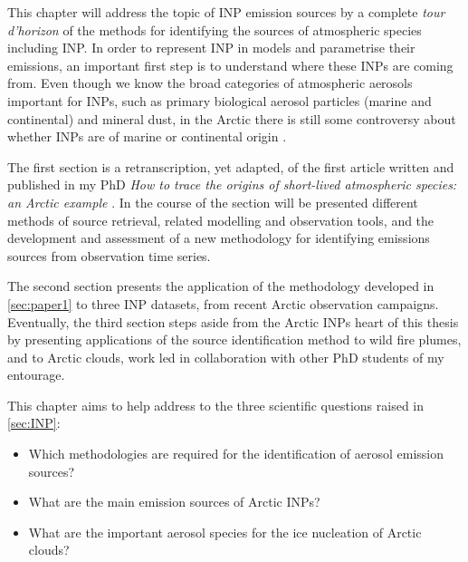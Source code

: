 This chapter will address the topic of INP emission sources by a complete \textit{tour d'horizon} of the methods for identifying the sources of atmospheric species including INP.
In order to represent INP in models and parametrise their emissions, an important first step is to understand where these INPs are coming from. Even though we know the broad categories of atmospheric aerosols important for INPs, such as primary biological aerosol particles (marine and continental) and mineral dust, in the Arctic there is still some controversy about whether INPs are of marine or continental origin \citep{hartmann_terrestrial_2021, creamean_marine_2018, wex_annual_2019} .
%

The first section is a retranscription, yet adapted, of the first article written and published in my PhD \textit{How to trace the origins of short-lived atmospheric species: an Arctic example} \citep{da_silva_how_2025}.
In the course of the section will be presented different methods of source retrieval, related modelling and observation tools, and the development and assessment of a new methodology for identifying emissions sources from observation time series.  

The second section presents the application of the methodology developed in \cref{sec:paper1} to three INP datasets, from recent Arctic observation campaigns.
Eventually, the third section steps aside from the Arctic INPs heart of this thesis by presenting applications of the source identification method to wild fire plumes, and to Arctic clouds, work led in collaboration with other PhD students of my entourage.

This chapter aims to help address to the three scientific questions raised in \cref{sec:INP}:
\begin{itemize}
    \item Which methodologies are required for the identification of aerosol emission sources?
    \item What are the main emission sources of Arctic INPs?
    \item What are the important aerosol species for the ice nucleation of Arctic clouds?
\end{itemize}


